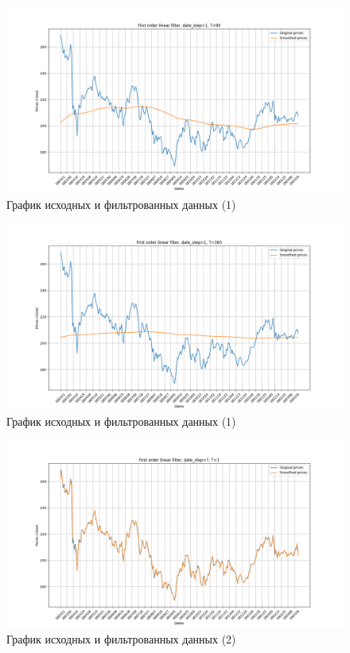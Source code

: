 \documentclass[a4paper, 12pt]{article}
\begin{document}
    \begin{figure}[H]
        \centering
        \includegraphics[scale=0.35]{1_90.png}
        \captionsetup{skip=0pt}
        \caption{График исходных и фильтрованных данных (1)}
        \label{fig:90}
    \end{figure}
    \begin{figure}[H]
        \centering
        \includegraphics[scale=0.35]{1_365.png}
        \captionsetup{skip=0pt}
        \caption{График исходных и фильтрованных данных (1)}
        \label{fig:365}
    \end{figure}
    \begin{figure}[H]
        \centering
        \includegraphics[scale=0.35]{2_1.png}
        \captionsetup{skip=0pt}
        \caption{График исходных и фильтрованных данных (2)}
        \label{fig:112}
    \end{figure}
\end{document}
